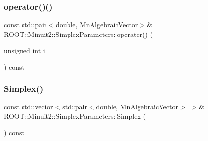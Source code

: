\mbox{\label{classROOT_1_1Minuit2_1_1SimplexParameters_aa05f3fb5da27277879fad702d85bae49}} 
\subsubsection{\texorpdfstring{operator()()}{operator()()}\hspace{0.1cm}{\footnotesize\ttfamily [3/3]}}
{\footnotesize\ttfamily const std\+::pair$<$double, \mbox{\hyperlink{namespaceROOT_1_1Minuit2_a62ed97730a1ca8d3fbaec64a19aa11c9}{Mn\+Algebraic\+Vector}}$>$\& R\+O\+O\+T\+::\+Minuit2\+::\+Simplex\+Parameters\+::operator() (\begin{DoxyParamCaption}\item[{unsigned int}]{i }\end{DoxyParamCaption}) const\hspace{0.3cm}{\ttfamily [inline]}}

\mbox{\label{classROOT_1_1Minuit2_1_1SimplexParameters_a873b8883c6932b879348e73d36d86afb}} 
\subsubsection{\texorpdfstring{Simplex()}{Simplex()}\hspace{0.1cm}{\footnotesize\ttfamily [1/3]}}
{\footnotesize\ttfamily const std\+::vector$<$std\+::pair$<$double, \mbox{\hyperlink{namespaceROOT_1_1Minuit2_a62ed97730a1ca8d3fbaec64a19aa11c9}{Mn\+Algebraic\+Vector}}$>$ $>$\& R\+O\+O\+T\+::\+Minuit2\+::\+Simplex\+Parameters\+::\+Simplex (\begin{DoxyParamCaption}{ }\end{DoxyParamCaption}) const\hspace{0.3cm}{\ttfamily [inline]}}

